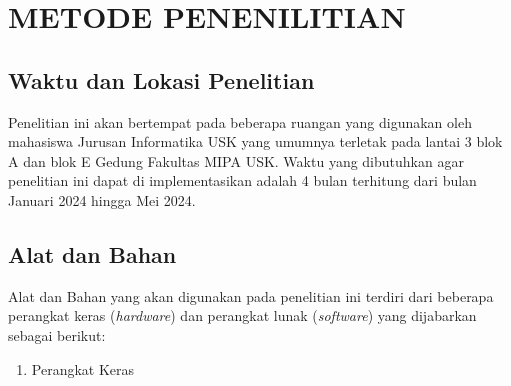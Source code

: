 \chapter{METODE PENENILITIAN}
\section{Waktu dan Lokasi Penelitian}
Penelitian ini akan bertempat pada beberapa ruangan yang digunakan oleh mahasiswa Jurusan Informatika USK yang umumnya terletak pada lantai 3 blok A dan blok E Gedung Fakultas MIPA USK. Waktu yang dibutuhkan agar penelitian ini dapat di implementasikan adalah 4 bulan terhitung dari bulan Januari 2024 hingga Mei 2024.

\section{Alat dan Bahan}
Alat dan Bahan yang akan digunakan pada penelitian ini terdiri dari beberapa perangkat keras (\textit{hardware}) dan perangkat lunak (\textit{software}) yang dijabarkan sebagai berikut:

\begin{enumerate}
\item Perangkat Keras
\end{enumerate}
\newpage

